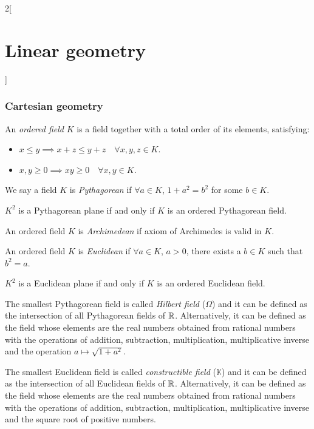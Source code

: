 \documentclass[../../../main.tex]{subfiles}
\begin{document}
\begin{multicols}{2}[\section{Linear geometry}]
  \subsubsection{Cartesian geometry}
  \begin{definition}
    An \emph{ordered field} $K$ is a field together with a total order of its elements, satisfying:
    \begin{itemize}
      \item $x\leq y\implies x+z\leq y+z\quad\forall x,y,z\in K$.
      \item $x,y\geq 0\implies xy\geq 0\quad\forall x,y\in K$.
    \end{itemize}
  \end{definition}
  \begin{definition}
    We say a field $K$ is \emph{Pythagorean} if $\forall a\in K$, $1+a^2=b^2$ for some $b\in K$.
  \end{definition}
  \begin{theorem}
    $K^2$ is a Pythagorean plane if and only if $K$ is an ordered Pythagorean field.
  \end{theorem}
  \begin{definition}
    An ordered field $K$ is \emph{Archimedean} if axiom of Archimedes is valid in $K$.
  \end{definition}
  \begin{definition}
    An ordered field $K$ is \emph{Euclidean} if $\forall a\in K$, $a>0$, there exists a $b\in K$ such that $b^2=a$.
  \end{definition}
  \begin{theorem}
    $K^2$ is a Euclidean plane if and only if $K$ is an ordered Euclidean field.
  \end{theorem}
  \begin{definition}
    The smallest Pythagorean field is called \emph{Hilbert field} ($\Omega$) and it can be defined as the intersection of all Pythagorean fields of $\mathbb{R} $. Alternatively, it can be defined as the field whose elements are the real numbers obtained from rational numbers with the operations of addition, subtraction, multiplication, multiplicative inverse and the operation $a\mapsto\sqrt{1+a^2}$.
  \end{definition}
  \begin{definition}
    The smallest Euclidean field is called \emph{constructible field} ($\mathbb{K}$) and it can be defined as the intersection of all Euclidean fields of $\mathbb{R} $. Alternatively, it can be defined as the field whose elements are the real numbers obtained from rational numbers with the operations of addition, subtraction, multiplication, multiplicative inverse and the square root of positive numbers.
  \end{definition}

\end{multicols}
\end{document}
